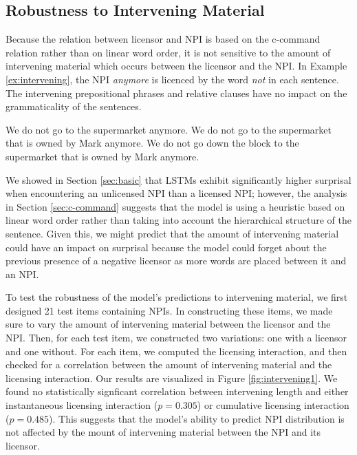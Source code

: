 \documentclass[11pt, round]{article}
\begin{document}
\subsection{Robustness to Intervening Material}
\label{sec:intervening}
Because the relation between licensor and NPI is based on the c-command relation rather than on linear word order, it is not sensitive to the amount of intervening material which occurs between the licensor and the NPI. In Example \ref{ex:intervening}, the NPI \textit{anymore} is licenced by the word \textit{not} in each sentence. The intervening prepositional phrases and relative clauses have no impact on the grammaticality of the sentences.
\begin{exe}
\ex \label{ex:intervening}
\begin{xlist}
\ex We do not go to the supermarket anymore.
\ex We do not go to the supermarket that is owned by Mark anymore.
\ex We do not go down the block to the supermarket that is owned by Mark anymore. 
\end{xlist}
\end{exe}
We showed in Section \ref{sec:basic} that LSTMs exhibit significantly higher surprisal when encountering an unlicensed NPI than a licensed NPI; however, the analysis in Section \ref{sec:c-command} suggests that the model is using a heuristic based on linear word order rather than taking into account the hierarchical structure of the sentence. Given this, we might predict that the amount of intervening material could have an impact on surprisal because the model could forget about the previous presence of a negative licensor as more words are placed between it and an NPI. 

To test the robustness of the model's predictions to intervening material, we first designed 21 test items containing NPIs. In constructing these items, we made sure to vary the amount of intervening material between the licensor and the NPI. Then, for each test item, we constructed two variations: one with a licensor and one without. For each item, we computed the licensing interaction, and then checked for a correlation between the amount of intervening material and the licensing interaction. Our results are visualized in Figure \ref{fig:intervening1}. We found no statistically signficant correlation between intervening length and either instantaneous licensing interaction ($p = 0.305$) or cumulative licensing interaction ($p = 0.485$). This suggests that the model's ability to predict NPI distribution is not affected by the mount of intervening material between the NPI and its licensor.
\end{document}
